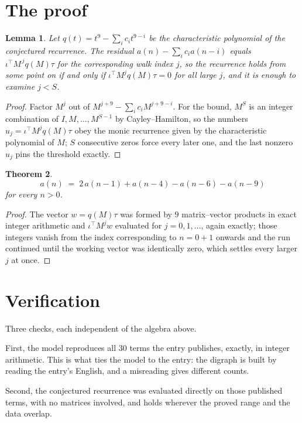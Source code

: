 \documentclass[11pt,a4paper]{article}
\theoremstyle{plain}
\newtheorem{theorem}{Theorem}
\newtheorem{lemma}[theorem]{Lemma}
\theoremstyle{definition}
\begin{document}
\section{The proof}

\begin{lemma}\label{lem:crit}
Let $q(t)=t^{9}-\sum_i c_it^{9-i}$ be the characteristic polynomial of the
conjectured recurrence. The residual $a(n)-\sum_ic_ia(n-i)$ equals
$\iota^{\!\top}M^{\,j}q(M)\tau$ for the corresponding walk index $j$, so the recurrence
holds from some point on if and only if $\iota^{\!\top}M^{j}q(M)\tau=0$ for all large $j$,
and it is enough to examine $j<S$.
\end{lemma}

\begin{proof}
Factor $M^{j}$ out of $M^{j+9}-\sum_ic_iM^{j+9-i}$. For the bound, $M^{S}$
is an integer combination of $I,M,\dots,M^{S-1}$ by Cayley--Hamilton, so the numbers
$u_j=\iota^{\!\top}M^{j}q(M)\tau$ obey the monic recurrence given by the characteristic
polynomial of $M$; $S$ consecutive zeros force every later one, and the last nonzero $u_j$
pins the threshold exactly.
\end{proof}

\begin{theorem}
\[
a(n)\;=\;2\,a(n-1) + a(n-4) - a(n-6) - a(n-9)
\]
for every $n>0$.
\end{theorem}

\begin{proof}
The vector $w=q(M)\tau$ was formed by $9$ matrix--vector products in exact integer
arithmetic and $\iota^{\!\top}M^{j}w$ evaluated for $j=0,1,\dots$, again exactly; those
integers vanish from the index corresponding to $n=0+1$ onwards and the run continued
until the working vector was identically zero, which settles every larger $j$ at once.
\end{proof}

\section{Verification}

Three checks, each independent of the algebra above.

First, the model reproduces all $30$ terms the entry publishes, exactly, in integer
arithmetic. This is what ties the model to the entry: the digraph is built by reading the
entry's English, and a misreading gives different counts.

Second, the conjectured recurrence was evaluated directly on those published terms, with no
matrices involved, and holds wherever the proved range and the data overlap.
\end{document}

